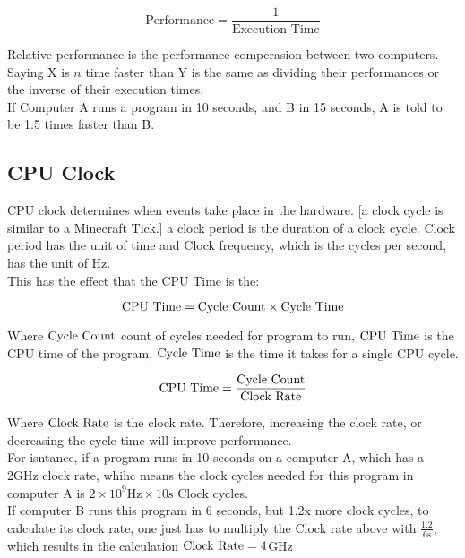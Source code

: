 \documentclass[11pt,a4paper,twocolumn]{book}
\begin{document}
\begin{equation}
\text{Performance} = \frac{1}{\text{Execution Time}}
\end{equation}

Relative performance is the performance comperasion between two computers. Saying X is $n$ time faster than Y is the same as dividing their performances or the inverse of their execution times.\\

If Computer A runs a program in 10 seconds, and B in 15 seconds, A is told to be 1.5 times faster than B.

\subsection{CPU Clock}

CPU clock determines when events take place in the hardware. [a clock cycle is similar to a Minecraft Tick.] a clock period is the duration of a clock cycle. Clock period has the unit of time and Clock frequency, which is the cycles per second, has the unit of Hz.\\

This has the effect that the CPU Time is the:

\begin{equation}
\text{CPU Time} = \text{Cycle Count} \times \text{Cycle Time} 
\end{equation}

Where $\text{Cycle Count}$ count of cycles needed for program to run, $\text{CPU Time}$ is the CPU time of the program, $\text{Cycle Time}$ is the time it takes for a single CPU cycle.

\begin{equation}
\text{CPU Time} = \frac{\text{Cycle Count}}{\text{Clock Rate}}
\end{equation}

Where $\text{Clock Rate}$ is the clock rate. Therefore, increasing the clock rate, or decreasing the cycle time will improve performance.\\

For isntance, if a program runs in 10 seconds on a computer A, which has a 2GHz clock rate, whihc means the clock cycles needed for this program in computer A is $2 \times 10^9\text{Hz} \times 10\text{s} $ Clock cycles.\\

If computer B runs this program in 6 seconds, but 1.2x more clock cycles, to calculate its clock rate, one just has to multiply the Clock rate above with $\frac{1.2}{6\text{s}}$, which results in the calculation $\text{Clock Rate} = 4$GHz\\
\end{document}
